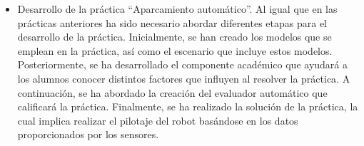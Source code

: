 \begin{itemize}
\item Desarrollo de la práctica ``Aparcamiento automático''. Al igual que en las prácticas anteriores ha sido necesario abordar diferentes etapas para el desarrollo de la práctica. Inicialmente, se han creado los modelos que se emplean en la práctica, así como el escenario que incluye estos modelos. Posteriormente, se ha desarrollado el componente académico que ayudará a los alumnos conocer distintos factores que influyen al resolver la práctica. A continuación, se ha abordado la creación del evaluador automático que calificará la práctica. Finalmente, se ha realizado la solución de la práctica, la cual implica realizar el pilotaje del robot basándose en los datos proporcionados por los sensores.
\end{itemize}